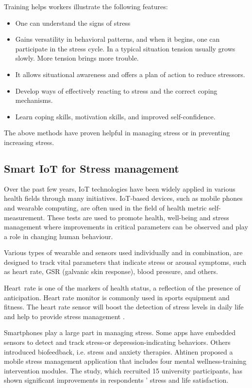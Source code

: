 Training helps workers illustrate the following features:
\begin{itemize}
    \item One can understand the signs of stress 
    \item Gains versatility in behavioral patterns, and when it begins, one can participate in the stress cycle. In a typical situation tension usually grows slowly. More tension brings more trouble. 
    \item It allows situational awareness and offers a plan of action to reduce stressors.
    \item Develop ways of effectively reacting to stress and the correct coping mechanisms. 
    \item Learn coping skills, motivation skills, and improved self-confidence.
\end{itemize}

The above methods have proven helpful in managing stress or in preventing increasing stress. \citep{Michie2002CausesWork.}

\subsection{Smart \acs{IoT} for Stress management}
Over the past few years, \acs{IoT} technologies have been widely applied in various health fields through many initiatives. \acs{IoT}-based devices, such as mobile phones and wearable computing, are often used in the field of health metric self-measurement.  These tests are used to promote health, well-being and stress management where improvements in critical parameters can be observed and play a role in changing human behaviour. 

Various types of wearable and sensors used individually and in combination, are designed to track vital parameters that indicate stress or arousal symptoms, such as heart rate, GSR (galvanic skin response), blood pressure, and others. 

Heart rate is one of the markers of health status, a reflection of the presence of anticipation.  Heart rate monitor is commonly used in sports equipment\citep{Fu2015SystemDevice} and fitness.  The heart rate sensor will boost the detection of stress levels in daily life and help to provide stress management\cite[p.330-339]{Millings2015CanTechnology} \cite[p.361-371]{Parnandi2017PhysiologicalGames}.

Smartphones play a large part in managing stress.  Some apps have embedded sensors to detect and track stress-or depression-indicating behaviors\cite[p.175]{Saeb2015MobileStudy}. Others introduced biofeedback, i.e. stress and anxiety therapies\cite[p.1274-1286]{AlOsman2016UbiquitousManagement}\citep{Zafar2017PlayingBiofeedback}. Ahtinen proposed a mobile stress management application that includes four mental wellness-training intervention modules\cite[p.11]{Ahtinen2013MobileStudy}. The study, which recruited 15 university participants, has shown significant improvements in respondents ' stress and life satisfaction.

